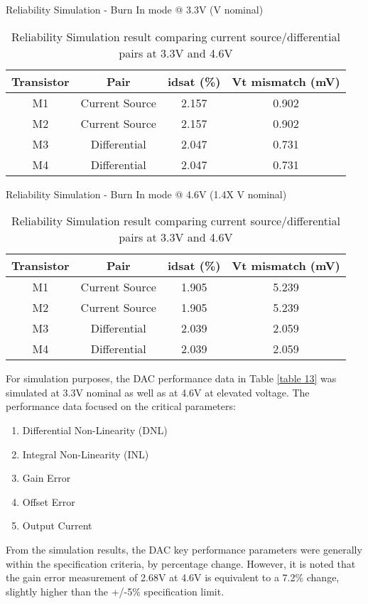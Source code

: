 \documentclass[11pt,a4paper]{article}
\begin{document}
\begin{table}[t]
\centering
\caption{Reliability Simulation result comparing current source/differential pairs at 3.3V and 4.6V}
\label{table2}

Reliability Simulation - Burn In mode @ 3.3V (V nominal)
\begin{tabular}{|c|c|c|c|} \hline
Transistor &Pair &idsat (\%) & Vt mismatch (mV)\\
\hline
M1 & Current Source & 2.157 & 0.902\\
M2 & Current Source & 2.157 & 0.902\\
M3 & Differential & 2.047 & 0.731\\
M4 & Differential & 2.047 & 0.731\\
\hline
\end{tabular}

Reliability Simulation - Burn In mode @ 4.6V (1.4X V nominal)
\begin{tabular}{|c|c|c|c|} \hline
Transistor & Pair & idsat (\%) & Vt mismatch (mV)\\
\hline
M1 & Current Source & 1.905 & 5.239\\
M2 & Current Source & 1.905 & 5.239\\
M3 & Differential & 2.039 & 2.059\\
M4 & Differential & 2.039 & 2.059\\
\hline
\end{tabular}

\end{table}



For simulation purposes, the DAC performance data in Table \ref{table 13} was simulated at 3.3V nominal as well as at 4.6V at elevated voltage. The performance data focused on the critical parameters: 
\begin{enumerate}
\item Differential Non-Linearity (DNL)
\item Integral Non-Linearity (INL)
\item Gain Error
\item Offset Error
\item Output Current
\end{enumerate}
From the simulation results, the DAC key performance parameters were generally within the specification criteria, by percentage change. However, it is noted that the gain error measurement of 2.68V at 4.6V is equivalent to a 7.2\% change, slightly higher than the +/-5\% specification limit. 
\end{document}
